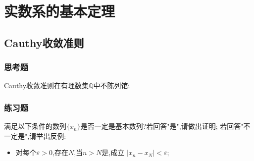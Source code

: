 \documentclass[cn,chinese]{elegantbook}
\begin{document}
    \chapter{实数系的基本定理}
        \section{Cauthy收敛准则}
            \subsection{思考题}
            \begin{exercise}
                Cauthy收敛准则在有理数集$\mathbb{Q}$中不陈列馆i
            \end{exercise}
            \begin{solution}
                
            \end{solution}
        
            \subsection{练习题}
            \begin{exercise}
                满足以下条件的数列$\{x_n\}$是否一定是基本数列?若回答"是",请做出证明;
                若回答"不一定是",请举出反例:
                \begin{itemize}
                    \item 对每个$\varepsilon>0$,存在$N$,当$n>N$是,成立
                    $\lvert x_n-x_N\rvert<\varepsilon$;
                \end{itemize}
            \end{exercise}
\end{document}
